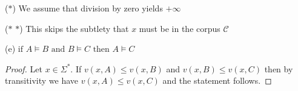 \documentclass[11pt]{article}
\begin{document}
($\ast$) {\color{red}We assume that division by zero yields $+\infty$}

($\ast$ $\ast$) {\color{red}This skips the subtlety that $x$ must be in the corpus $\mathcal{C}$}


(e) $\text{if } A \models B \text{ and } B \models C\text{ then } A \models C$
\begin{proof}
Let $x \in \Sigma^\ast$.
If $v(x, A) \leq v(x, B)$ and $v(x, B) \leq v(x, C)$ then by transitivity we have $v(x, A) \leq v(x, C)$ and the statement follows.
\end{proof}
\end{document}
